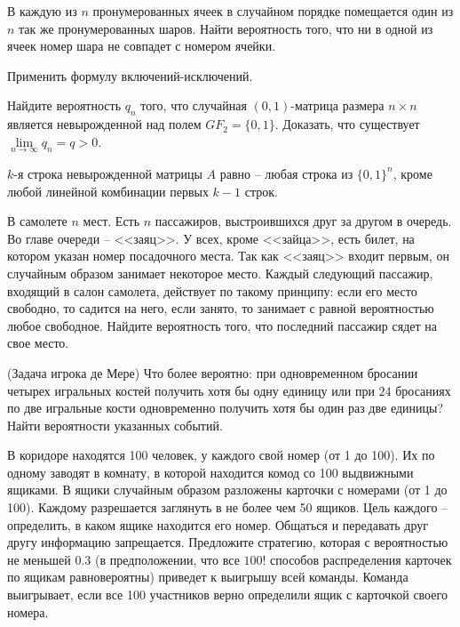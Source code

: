 \begin{problem}
В каждую из $n$ пронумерованных ячеек в случайном порядке помещается один из $n$ так же пронумерованных шаров. 
Найти вероятность того, что ни в одной из ячеек номер шара не совпадет с номером ячейки. 

\begin{ordre}
Применить формулу включений-исключений.
\end{ordre}
\end{problem}

\begin{problem} 
Найдите вероятность $q_n$ того, что случайная $(0,1)$-матрица размера $n\times n$ является невырожденной над полем 
$GF_2=\{ 0,1\}$. Доказать, что существует $\lim\limits_{n\to\infty} q_n=q>0$. 
\end{problem}

\begin{ordre}
$k$-я строка невырожденной матрицы $A$ равно -- любая строка из $\{ 0,1\}^n$, 
кроме любой линейной комбинации первых $k-1$ строк. 
\end{ordre}

\begin{problem}
В самолете $n$ мест. Есть $n$ пассажиров, выстроившихся друг за другом в очередь. Во главе очереди -- <<заяц>>. У всех, 
кроме <<зайца>>, есть билет, на котором указан номер посадочного места. Так как <<заяц>> входит первым, он случайным образом занимает 
некоторое место. Каждый следующий пассажир, входящий в салон самолета, действует по такому принципу: если его место свободно, то 
садится на него, если занято, то занимает с равной вероятностью любое свободное. Найдите вероятность того, что последний пассажир 
сядет на свое место. 
\end{problem}

\begin{problem}
(Задача игрока де Мере) 
Что более вероятно: при одновременном бросании четырех игральных костей получить хотя бы одну единицу или при $24$ бросаниях 
по две игральные кости одновременно получить хотя бы один раз две единицы? Найти вероятности указанных событий. 
\end{problem}

\begin{problem}
В коридоре находятся 100 человек, у каждого свой номер (от 1 до 100). Их по одному заводят в комнату, в которой 
находится комод со 100 выдвижными ящиками. В ящики случайным образом 
разложены карточки с номерами (от 1 до 100). Каждому разрешается заглянуть в 
не более чем 50 ящиков. Цель каждого -- определить, в каком ящике находится 
его номер. Общаться и передавать друг другу информацию запрещается. 
Предложите стратегию, которая с вероятностью не меньшей $0.3$ (в 
предположении, что все $100!$ способов распределения карточек по ящикам 
равновероятны) приведет к выигрышу всей команды. Команда выигрывает, если 
все 100 участников верно определили ящик с карточкой своего номера.
\end{problem}

